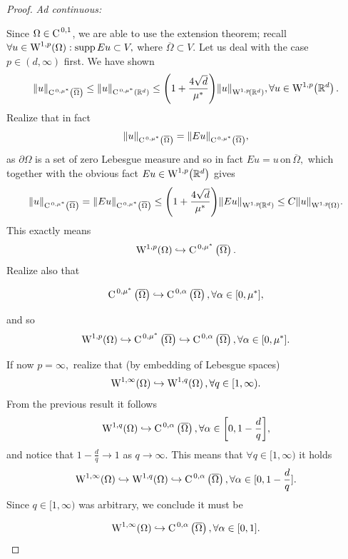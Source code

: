 \documentclass{article}
\begin{document}
\begin{proof}
    \textit{Ad continuous:}

    Since $\Omega \in \text{C}^{\!\,\, 0,1}$, we are able to use the extension theorem; recall $\forall u \in \WkpSet[1][p]{\Omega}: \supp Eu \subset V,$ where $\overline{\Omega} \subset V.$ Let us deal with the case $p \in (d, \infty)$ first. We have shown
    \[
	    \norm{u}_{\CklSet{0}{\mu^{*}}{\overline{\Omega}}} \leq \norm{u}_{\CklSet{0}{\mu^{*}}{\R^{d}}} \leq \qty(1+ \frac{4 \sqrt{d}}{\mu^{*}})\norm{u}_{\WkpSet[1][p]{\R^{d}}}, \forall u \in \WkpSet[1][p]{\R^{d}}.
    \]
    Realize that in fact
    \[
	    \norm{u}_{\text{C}^{\!\, \,0,\mu^{*}}\!\,\left(\overline{\Omega} \right)} = \norm{Eu}_{\text{C}^{\!\, \,0,\mu^{*}}\!\,\left(\overline{\Omega} \right)},
    \]
    as $\partial \Omega$ is a set of zero Lebesgue measure and so in fact $Eu = u \, \text{on} \, \overline{\Omega},$ which together with the obvious fact $Eu \in \WkpSet[1][p]{\R^{d}}$ gives
    \[
	    \norm{u}_{\CklSet{0}{\mu^{*}}{\overline{\Omega}}} = \norm{Eu}_{\CklSet{0}{\mu^{*}}{\overline{\Omega}}} \leq \qty(1 + \frac{4 \sqrt{d}}{\mu^{*}})\norm{Eu}_{\WkpSet[1][p]{\R^{d}}} \leq C \norm{u}_{\WkpSet[1][p]{\Omega}}.
    \]
    This exactly means
    \[
	    \WkpSet[1][p]{\Omega} \hookrightarrow \CklSet{0}{\mu^{*}}{\overline{\Omega}}.
    \]
    Realize also that

    \[
	    \text{C}^{\!\, \,0,\mu^{*}}\!\,\left(\overline{\Omega} \right) \hookrightarrow \text{C}^{\!\, \,0,\alpha}\!\,\left(\overline{\Omega} \right), \forall \alpha \in [0,\mu^{*}],
    \]

    and so
    \[
	    \WkpSet[1][p]{\Omega} \hookrightarrow \CklSet{0}{\mu^{*}}{\overline{\Omega}} \hookrightarrow \CklSet{0}{\alpha}{\overline{\Omega}}, \forall \alpha \in [0,\mu^{*}].
    \]

    If now $p = \infty,$ realize that (by embedding of Lebesgue spaces)
    \[
	    \WkpSet[1][\infty]{\Omega} \hookrightarrow \WkpSet[1][q]{\Omega}, \forall q \in [1, \infty).
    \]
    From the previous result it follows
    \[
	    \WkpSet[1][q]{\Omega} \hookrightarrow \CklSet{0}{\alpha}{\overline{\Omega}}, \forall \alpha \in \qty[0, 1 - \frac{d}{q}],
    \]
    and notice that $1- \frac{d}{q} \to 1$ as $q \to \infty.$ This means that $\forall q \in [1,\infty)$ it holds
    \[
	    \WkpSet[1][\infty]{\Omega} \hookrightarrow \WkpSet[1][q]{\Omega} \hookrightarrow \CklSet{0}{\alpha}{\overline{\Omega}}, \forall \alpha \in [0, 1- \frac{d}{q}].
    \]
    Since $q \in [1, \infty)$ was arbitrary, we conclude it must be


    \[
	    \WkpSet[1][\infty]{\Omega} \hookrightarrow \CklSet{0}{\alpha}{\overline{\Omega}}, \forall \alpha \in [0,1].
    \]



\end{proof}
\end{document}
